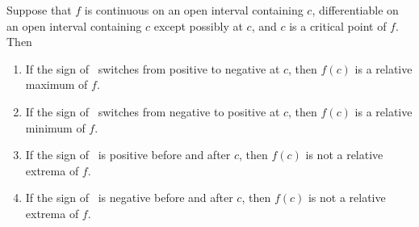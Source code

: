 \begin{theorem}\label{thm:first_der}%
Suppose that $f$ is continuous on an open interval containing $c$, differentiable on an open interval containing $c$ except possibly at $c$, and $c$ is a critical point of $f$. Then
\begin{enumerate}
\item	If the sign of \fp\ switches from positive to negative at $c$, then $f(c)$ is a relative maximum of $f$.
\item	If the sign of \fp\ switches from negative to positive at $c$, then $f(c)$ is a relative minimum of $f$.
\item	If the sign of \fp\ is positive before and after $c$, then $f(c)$ is not a relative extrema of $f$.
\item	If the sign of \fp\ is negative before and after $c$, then $f(c)$ is not a relative extrema of $f$.
\end{enumerate}
\end{theorem}

